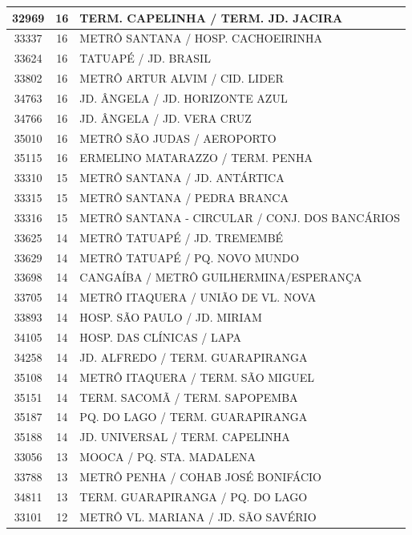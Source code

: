 \documentclass[
	12pt,				%
	oneside,			%
	a4paper,			%
	english,			%
	brazil				%
	]{abntex2ppgsi}
\begin{document}
\begin{apendicesenv}
\begin{longtable}{c|c|p{7cm}}
\hline
    32969 & 16    & TERM. CAPELINHA / TERM. JD. JACIRA \\
\hline
    33337 & 16    & METRÔ SANTANA / HOSP. CACHOEIRINHA \\
\hline
    33624 & 16    & TATUAPÉ / JD. BRASIL \\
\hline
    33802 & 16    & METRÔ ARTUR ALVIM / CID. LIDER \\
\hline
    34763 & 16    & JD. ÂNGELA / JD. HORIZONTE AZUL \\
\hline
    34766 & 16    & JD. ÂNGELA / JD. VERA CRUZ \\
\hline
    35010 & 16    & METRÔ SÃO JUDAS / AEROPORTO \\
\hline
    35115 & 16    & ERMELINO MATARAZZO / TERM. PENHA \\
\hline
    33310 & 15    & METRÔ SANTANA / JD. ANTÁRTICA \\
\hline
    33315 & 15    & METRÔ SANTANA / PEDRA BRANCA \\
\hline
    33316 & 15    & METRÔ SANTANA - CIRCULAR / CONJ. DOS BANCÁRIOS \\
\hline
    33625 & 14    & METRÔ TATUAPÉ / JD. TREMEMBÉ \\
\hline
    33629 & 14    & METRÔ TATUAPÉ / PQ. NOVO MUNDO \\
\hline
    33698 & 14    & CANGAÍBA / METRÔ GUILHERMINA/ESPERANÇA \\
\hline
    33705 & 14    & METRÔ ITAQUERA / UNIÃO DE VL. NOVA \\
\hline
    33893 & 14    & HOSP. SÃO PAULO / JD. MIRIAM \\
\hline
    34105 & 14    & HOSP. DAS CLÍNICAS / LAPA \\
\hline
    34258 & 14    & JD. ALFREDO / TERM. GUARAPIRANGA \\
\hline
    35108 & 14    & METRÔ ITAQUERA / TERM. SÃO MIGUEL \\
\hline
    35151 & 14    & TERM. SACOMÃ / TERM. SAPOPEMBA \\
\hline
    35187 & 14    & PQ. DO LAGO / TERM. GUARAPIRANGA \\
\hline
    35188 & 14    & JD. UNIVERSAL / TERM. CAPELINHA \\
\hline
    33056 & 13    & MOOCA / PQ. STA. MADALENA \\
\hline
    33788 & 13    & METRÔ PENHA / COHAB JOSÉ BONIFÁCIO \\
\hline
    34811 & 13    & TERM. GUARAPIRANGA / PQ. DO LAGO \\
\hline
    33101 & 12    & METRÔ VL. MARIANA / JD. SÃO SAVÉRIO \\

\end{longtable}
\end{apendicesenv}
\end{document}
